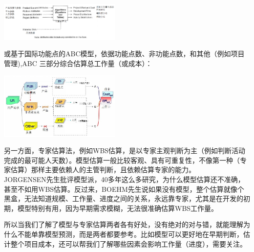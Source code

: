 \includegraphics[width=6cm]{估算3.png}

或基于国际功能点的ABC模型，依据功能点数、非功能点数，和其他（例如项目管理),ABC
三部分综合估算总工作量（或成本）：


\includegraphics[width=6cm]{ABC模型.jpg}

另一方面，专家估算法，例如WBS估算，是以专家主观判断为主（例如判断活动完成的最可能人天数）。模型估算一般比较客观、具有可重复性，不像第一种（专家估算）那样主要依赖人的主管判断，且依赖估算专家的能力。\\
JORGENSEN先生批评模型派，40多年这么多研究，为什么模型估算还不准确，甚至不如用WBS估算。反过来，BOEHM先生说如果没有模型，整个估算就像个黑盒，无法知道规模、工作量、进度之间的关系，永远靠专家，尤其是在开发的初期，模型特别有用，因为早期需求模糊，无法很准确估算WBS工作量。\\


所以当我们了解了模型与专家估算两者各有好处，没有绝对的对与错，就能理解为什么不能单靠模型预测，而是两者都要参考。比如模型可以更好地在早期判断，估计整个项目成本，还可以帮我们了解哪些因素会影响工作量（进度），需要关注。\\

